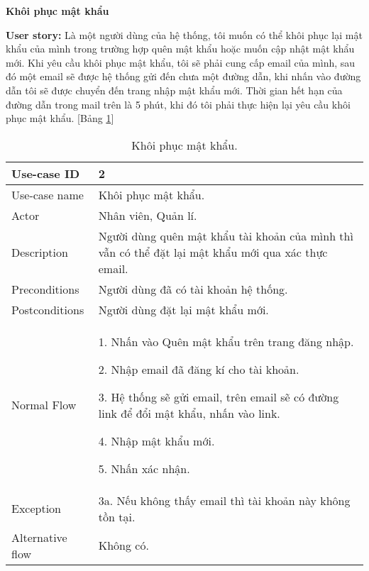 \textbf{Khôi phục mật khẩu}\par
\textbf{User story:} Là một người dùng của hệ thống, tôi muốn có thể khôi phục lại mật khẩu của mình trong trường hợp quên mật khẩu hoặc muốn cập nhật mật khẩu mới. Khi yêu cầu khôi phục mật khẩu, tôi sẽ phải cung cấp email của mình, sau đó một email sẽ được hệ thống gửi đến chưa một đường dẫn, khi nhấn vào đường dẫn tôi sẽ được chuyển đến trang nhập mật khẩu mới. Thời gian hết hạn của đường dẫn trong mail trên là 5 phút, khi đó tôi phải thực hiện lại yêu cầu khôi phục mật khẩu. [Bảng \ref{bang2}]
\begin{table}[H]
    \centering
    \begin{tabular}{|m{3cm}|m{10cm}|}
    \hline 
        Use-case ID & 2\\ \hline
        Use-case name & Khôi phục mật khẩu.\\ \hline
        Actor & Nhân viên, Quản lí.\\ \hline
        Description & Người dùng quên mật khẩu tài khoản của mình thì vẫn có thể đặt lại mật khẩu mới qua xác thực email.\\ \hline
        Preconditions & Người dùng đã có tài khoản hệ thống.\\ \hline
        Postconditions & Người dùng đặt lại mật khẩu mới.\\ \hline
        Normal Flow & 
        1. Nhấn vào Quên mật khẩu trên trang đăng nhập.\par
        2. Nhập email đã đăng kí cho tài khoản.\par
        3. Hệ thống sẽ gửi email, trên email sẽ có đường link để đổi mật khẩu, nhấn vào link.\par
        4. Nhập mật khẩu mới.\par
        5. Nhấn xác nhận.
        \\ \hline
        Exception & 3a. Nếu không thấy email thì tài khoản này không tồn tại.\\ \hline
        Alternative flow & Không có.\\ 
    \hline 
    \end{tabular}
    \caption{Khôi phục mật khẩu.}
    \label{bang2}
\end{table}


